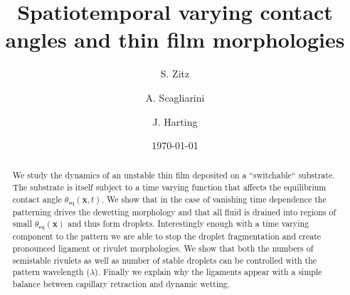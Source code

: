 \documentclass[twocolumn,amsmath,amssymb,showpacs,pre,nofootinbib,superscriptaddress]{revtex4-1} %
\begin{document}
\newcommand*\Diff[1]{\mathop{}\!\mathrm{d^#1}}


\title{Spatiotemporal varying contact angles and thin film morphologies}

\author{S. Zitz}
\author{A. Scagliarini}%
\author{J. Harting}
\date{\today}

\begin{abstract}
We study the dynamics of an unstable thin film deposited on a ``switchable`` substrate.
The substrate is itself subject to a time varying function that affects the equilibrium contact angle $\theta_{\text{eq}}(\mathbf{x},t)$.
We show that in the case of vanishing time dependence the patterning drives the dewetting morphology and that all fluid is drained into regions of small $\theta_{\text{eq}}(\mathbf{x})$ and thus form droplets.
Interestingly enough with a time varying component to the pattern we are able to stop the droplet fragmentation and create pronounced ligament or rivulet morphologies.
We show that both the numbers of semistable rivulets as well as number of stable droplets can be controlled with the pattern wavelength ($\lambda$).
Finally we explain why the ligaments appear with a simple balance between capillary retraction and dynamic wetting.   
\end{abstract}
\end{document}
